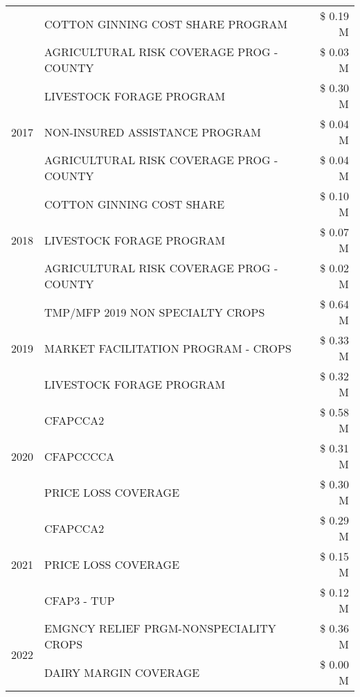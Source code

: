 \begin{tabular}{llr}
 & COTTON GINNING COST SHARE PROGRAM & \$ 0.19 M \\
 & AGRICULTURAL RISK COVERAGE PROG - COUNTY & \$ 0.03 M \\
\cline{1-3}
\multirow[t]{3}{*}{2017} & LIVESTOCK FORAGE PROGRAM & \$ 0.30 M \\
 & NON-INSURED ASSISTANCE PROGRAM & \$ 0.04 M \\
 & AGRICULTURAL RISK COVERAGE PROG - COUNTY & \$ 0.04 M \\
\cline{1-3}
\multirow[t]{3}{*}{2018} & COTTON GINNING COST SHARE & \$ 0.10 M \\
 & LIVESTOCK FORAGE PROGRAM & \$ 0.07 M \\
 & AGRICULTURAL RISK COVERAGE PROG - COUNTY & \$ 0.02 M \\
\cline{1-3}
\multirow[t]{3}{*}{2019} & TMP/MFP 2019 NON SPECIALTY CROPS & \$ 0.64 M \\
 & MARKET FACILITATION PROGRAM - CROPS & \$ 0.33 M \\
 & LIVESTOCK FORAGE PROGRAM & \$ 0.32 M \\
\cline{1-3}
\multirow[t]{3}{*}{2020} & CFAPCCA2 & \$ 0.58 M \\
 & CFAPCCCCA & \$ 0.31 M \\
 & PRICE LOSS COVERAGE & \$ 0.30 M \\
\cline{1-3}
\multirow[t]{3}{*}{2021} & CFAPCCA2 & \$ 0.29 M \\
 & PRICE LOSS COVERAGE & \$ 0.15 M \\
 & CFAP3 - TUP & \$ 0.12 M \\
\cline{1-3}
\multirow[t]{2}{*}{2022} & EMGNCY RELIEF PRGM-NONSPECIALITY CROPS & \$ 0.36 M \\
 & DAIRY MARGIN COVERAGE & \$ 0.00 M \\
\cline{1-3}
\bottomrule
\end{tabular}
